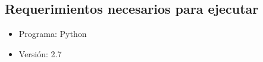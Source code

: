 \subsection{Requerimientos necesarios para ejecutar}
\begin{itemize}
\item Programa: Python
\item Versión: 2.7
\end{itemize}

